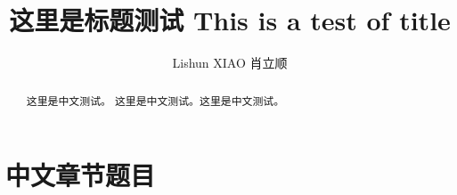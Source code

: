 \documentclass[review,3p]{elsarticle}
\begin{document}
	\begin{frontmatter}
		\title{这里是标题测试 This is a test of title}
		\author{Lishun XIAO 肖立顺} \address{江苏 徐州}
		\begin{abstract}
			\lipsum[2]这里是中文测试。 这里是中文测试。这里是中文测试。
		\end{abstract}
	\end{frontmatter}
	\section{中文章节题目}
\end{document}
